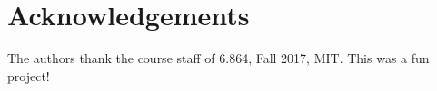 \documentclass{sigkddExp}
\begin{document}
\section{Acknowledgements}
\label{ack}
The authors thank the course staff of 6.864, Fall 2017, MIT. This was a fun project!

%

%
%

\end{document}
